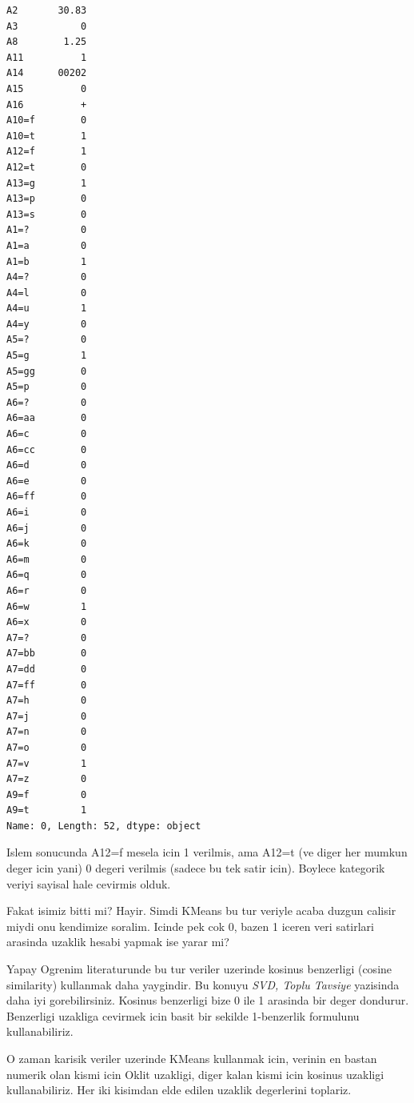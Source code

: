 \documentclass[12pt,fleqn]{article}\usepackage{../common}
\begin{document}
\begin{verbatim}
A2       30.83
A3           0
A8        1.25
A11          1
A14      00202
A15          0
A16          +
A10=f        0
A10=t        1
A12=f        1
A12=t        0
A13=g        1
A13=p        0
A13=s        0
A1=?         0
A1=a         0
A1=b         1
A4=?         0
A4=l         0
A4=u         1
A4=y         0
A5=?         0
A5=g         1
A5=gg        0
A5=p         0
A6=?         0
A6=aa        0
A6=c         0
A6=cc        0
A6=d         0
A6=e         0
A6=ff        0
A6=i         0
A6=j         0
A6=k         0
A6=m         0
A6=q         0
A6=r         0
A6=w         1
A6=x         0
A7=?         0
A7=bb        0
A7=dd        0
A7=ff        0
A7=h         0
A7=j         0
A7=n         0
A7=o         0
A7=v         1
A7=z         0
A9=f         0
A9=t         1
Name: 0, Length: 52, dtype: object
\end{verbatim}

Islem sonucunda A12=f mesela icin 1 verilmis, ama A12=t (ve diger her
mumkun deger icin yani) 0 degeri verilmis (sadece bu tek satir
icin). Boylece kategorik veriyi sayisal hale cevirmis olduk.

Fakat isimiz bitti mi? Hayir. Simdi KMeans bu tur veriyle acaba duzgun
calisir miydi onu kendimize soralim. Icinde pek cok 0, bazen 1 iceren 
veri satirlari arasinda uzaklik hesabi yapmak ise yarar mi?

Yapay Ogrenim literaturunde bu tur veriler uzerinde kosinus benzerligi
(cosine similarity) kullanmak daha yaygindir. Bu konuyu {\em SVD, Toplu
Tavsiye} yazisinda daha iyi gorebilirsiniz. Kosinus benzerligi bize
0 ile 1 arasinda bir deger dondurur. Benzerligi uzakliga cevirmek icin
basit bir sekilde 1-benzerlik formulunu kullanabiliriz.

O zaman karisik veriler uzerinde KMeans kullanmak icin, verinin en
bastan numerik olan kismi icin Oklit uzakligi, diger kalan kismi icin
kosinus uzakligi kullanabiliriz. Her iki kisimdan elde edilen uzaklik
degerlerini toplariz.
\end{document}
